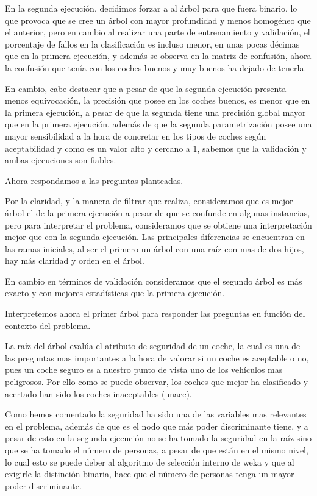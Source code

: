 \documentclass[a4paper, 11pt, twoside, openany, onecolumn, final]{memoir}
\begin{document}
	En la segunda ejecución, decidimos forzar a al árbol para que fuera binario, lo que provoca que se cree un  árbol con mayor profundidad y menos homogéneo que el anterior, pero en cambio al realizar una parte de entrenamiento y validación, el porcentaje de fallos en la clasificación es incluso menor, en unas pocas décimas que en la primera ejecución, y además se observa en la matriz de confusión, ahora la confusión que tenía con los coches buenos y muy buenos ha dejado de tenerla. 
	
	En cambio, cabe destacar que a pesar de que la segunda ejecución presenta menos equivocación, la precisión que posee en los coches buenos, es menor que en la primera ejecución, a pesar de que la segunda tiene una precisión global mayor que en la primera ejecución, además de que la segunda parametrización posee una mayor sensibilidad a la hora de concretar en los tipos de coches según aceptabilidad y como es un valor alto y cercano a $1$, sabemos que la validación y ambas ejecuciones son fiables.
	
	Ahora respondamos a las preguntas planteadas.
	
	Por la claridad, y la manera de filtrar que realiza, consideramos que es mejor árbol el de la primera ejecución a pesar de que se confunde en algunas instancias, pero para interpretar el problema, consideramos que se obtiene una interpretación mejor que con la segunda ejecución. Las principales diferencias se encuentran en las ramas iniciales, al ser el primero un árbol con una raíz con mas de dos hijos, hay más claridad y orden en el árbol. 
	
	En cambio en términos de validación consideramos que el segundo árbol es más exacto y con mejores estadísticas que la primera ejecución.
	
	Interpretemos ahora el primer árbol para responder las preguntas en función del contexto del problema.
	
	La raíz del árbol evalúa el atributo de seguridad de un coche, la cual es una de las preguntas mas importantes a la hora de valorar si un coche es aceptable o no, pues un coche seguro es a nuestro punto de vista uno de los vehículos mas peligrosos. Por ello como se puede observar, los coches que mejor ha clasificado y acertado han sido los coches inaceptables (unacc).
	
	Como hemos comentado la seguridad ha sido una de las variables mas relevantes en el problema, además de que es el nodo que más poder discriminante tiene, y a pesar de esto en la segunda ejecución no se ha tomado la seguridad en la raíz sino que se ha tomado el número de personas, a pesar de que están en el mismo nivel, lo cual esto se puede deber al algoritmo de selección interno de weka y que al exigirle la distinción binaria, hace que el número de personas tenga un mayor poder discriminante.   
	
\end{document}
